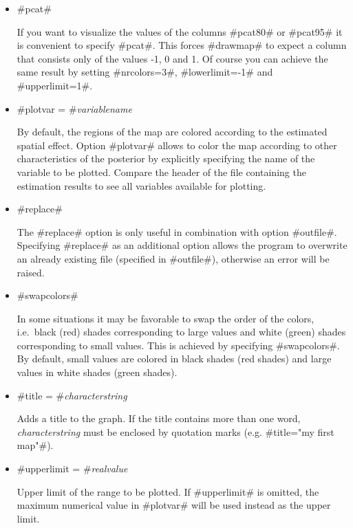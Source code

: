 \begin{itemize}
\item #pcat#

If you want to visualize the values of the columns #pcat80# or
#pcat95# it is convenient to specify #pcat#. This forces #drawmap#
to expect a column that consists only of the values -1, 0 and 1. Of
course you can achieve the same result by setting #nrcolors=3#,
#lowerlimit=-1# and #upperlimit=1#.

\item #plotvar = #{\em variablename}

By default, the regions of the map are colored according to the
estimated spatial effect. Option #plotvar# allows to color the map
according to other characteristics of the posterior by explicitly
specifying the name of the variable to be plotted. Compare the
header of the file containing the estimation results to see all
variables available for plotting.

\item #replace#

The #replace# option is only useful in combination with option
#outfile#. Specifying #replace# as an additional option allows the
program to overwrite an already existing file (specified in
#outfile#), otherwise an error will be raised.

\item #swapcolors#

In some situations it may be favorable to swap the order of the
colors, i.e.~black (red) shades corresponding to large values and
white (green) shades corresponding to small values. This is
achieved by specifying #swapcolors#. By default, small values are
colored in black shades (red shades) and large values in white
shades (green shades).

\item #title = #{\em characterstring}

Adds a title to the graph. If the title contains more than one
word, {\em characterstring} must be enclosed by quotation marks
(e.g. #title="my first map"#).

\item #upperlimit = #{\em realvalue}

Upper limit of the range to be plotted. If #upperlimit# is
omitted, the maximum numerical value in #plotvar# will be used
instead as the upper limit.

\end{itemize}


